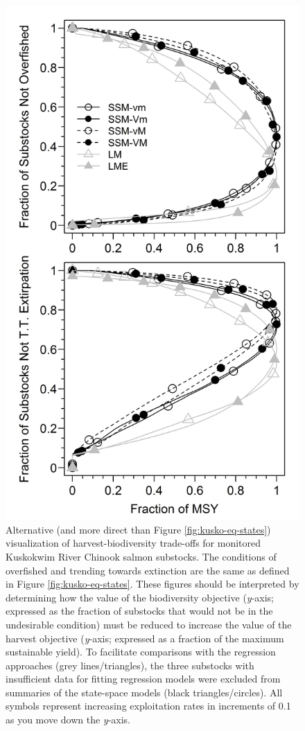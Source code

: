 \documentclass[12pt,]{book}
\theoremstyle{definition}
\theoremstyle{definition}
\theoremstyle{definition}
\theoremstyle{remark}
\begin{document}
\begin{figure}
  \centering
  \includegraphics{img/Ch4/kusko-trade-offs.jpg}
  \caption{Alternative (and more direct than Figure \ref{fig:kusko-eq-states}) visualization of harvest-biodiversity trade-offs for monitored Kuskokwim River Chinook salmon substocks. The conditions of overfished and trending towards extinction are the same as defined in Figure \ref{fig:kusko-eq-states}. These figures should be interpreted by determining how the value of the biodiversity objective (\textit{y}-axis; expressed as the fraction of substocks that would not be in the undesirable condition) must be reduced to increase the value of the harvest objective (\textit{y}-axis; expressed as a fraction of the maximum sustainable yield). To facilitate comparisons with the regression approaches (grey lines/triangles), the three substocks with insufficient data for fitting regression models were excluded from summaries of the state-space models (black triangles/circles). All symbols represent increasing exploitation rates in increments of 0.1 as you move down the \textit{y}-axis.}
  \label{fig:kusko-trade-offs}
\end{figure}
\end{document}
